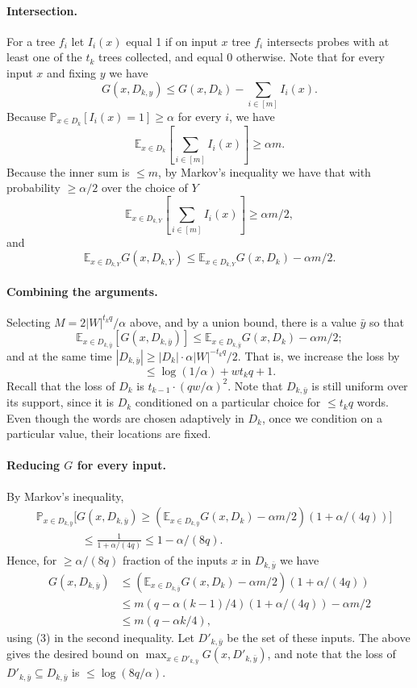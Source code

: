 \documentclass[10pt,a4paper]{article}
\begin{document}
\paragraph{Intersection.}
For a tree $f_i$ let $I_i(x)$ equal 1 if on input $x$ tree $f_i$ intersects probes with at least one of the $t_k$ trees collected, and equal 0 otherwise. Note that for every input $x$ and fixing $y$ we have
\[G(x,D_{k,y})\leq G(x,D_k)-\sum_{i\in[m]}I_i(x).\]
Because $\mathbb P_{x\in D_k}[I_i(x)=1]\geq\alpha$ for every $i$, we have
\[\mathbb E_{x\in D_k}\left[\sum_{i\in[m]}I_i(x)\right]\geq\alpha m.\]
Because the inner sum is $\leq m$, by Markov's inequality we have that with probability $\geq\alpha/2$ over the choice of $Y$
\[\mathbb E_{x\in D_{k,Y}}\left[\sum_{i\in[m]}I_i(x)\right]\geq\alpha m/2,\]
and
\[\mathbb E_{x\in D_{k,Y}}G(x,D_{k,Y})\leq\mathbb E_{x\in D_{k,Y}}G(x,D_k)-\alpha m/2.\]
\paragraph{Combining the arguments.}
Selecting $M=2|W|^{t_kq}/\alpha$ above, and by a union bound, there is a value $\bar y$ so that
\[\mathbb E_{x\in D_{k,\bar y}}[G(x,D_{k,\bar y})]\leq\mathbb E_{x\in D_{k,\bar y}}G(x,D_k)-\alpha m/2;\]
and at the same time $|D_{k,\bar y}|\geq|D_k|\cdot\alpha|W|^{-t_kq}/2$. That is, we increase the loss by
\[\leq\log(1/\alpha)+wt_kq+1.\]
Recall that the loss of $D_k$ is $t_{k-1}\cdot(qw/\alpha)^2$.
Note that $D_{k,\bar y}$ is still uniform over its support, since it is $D_k$ conditioned on a particular choice for $\leq t_kq$ words. Even though the words are chosen adaptively in $D_k$, once we condition on a particular value, their locations are fixed.
\paragraph{Reducing $G$ for every input.}
By Markov's inequality,
\begin{align*}
&\mathbb P_{x\in D_{k,\bar y}}\bigl[G(x,D_{k,\bar y})\geq(\mathbb E_{x\in D_{k,\bar y}}G(x,D_k)-\alpha m/2)(1+\alpha/(4q))\bigr]\\
&\hspace{4em}\leq\frac1{1+\alpha/(4q)}\leq1-\alpha/(8q).
\end{align*}
Hence, for $\geq\alpha/(8q)$ fraction of the inputs $x$ in $D_{k,\bar y}$ we have
\begin{align*}
G(x,D_{k,\bar y})&\leq(\mathbb E_{x\in D_{k,\bar y}}G(x,D_k)-\alpha m/2)(1+\alpha/(4q))\\
&\leq m(q-\alpha(k-1)/4)(1+\alpha/(4q))-\alpha m/2\\
&\leq m(q-\alpha k/4),
\end{align*}
using (3) in the second inequality. Let $D'_{k,\bar y}$ be the set of these inputs. The above gives the desired bound on $\max_{x\in D'_{k,\bar y}}G(x,D'_{k,\bar y})$, and note that the loss of $D'_{k,\bar y}\subseteq D_{k,\bar y}$ is $\leq\log(8q/\alpha)$.
\end{document}
